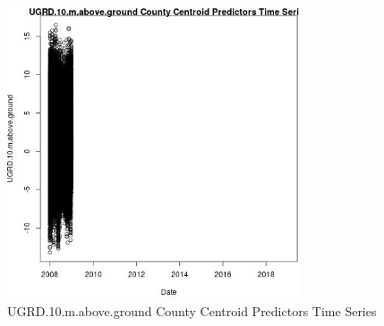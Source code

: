 \begin{figure} 
\centering  
\includegraphics[width=0.77\textwidth]{Code_Outputs/df_report_ML_predictors_CountyCentroid_Locations_Dates_2008-01-01to2018-12-31_UGRD10mabovegroundvDate.jpg} 
\caption{\label{fig:df_report_ML_predictors_CountyCentroid_Locations_Dates_2008-01-01to2018-12-31UGRD10mabovegroundvDate}UGRD.10.m.above.ground County Centroid Predictors Time Series} 
\end{figure} 
 

